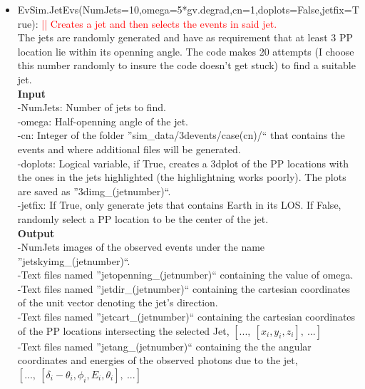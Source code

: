 \documentclass[article, superscriptaddress, ctexart, nofootinbib]{revtex4}
\newcommand{\tcr}{\textcolor{red}}
\begin{document}
\begin{itemize}
 \item{EvSim.JetEvs(NumJets=10,omega=5*gv.degrad,cn=1,doplots=False,jetfix=True):   \tcr{|| Creates a jet and then selects the events in said jet.}} \\
 The jets are randomly generated and have as requirement that at least 3 PP location lie within its openning angle.
 The code makes 20 attempts (I choose this number randomly to insure the code doesn't get stuck) to find a suitable jet.\\
 {\bf{Input}}\\
 -NumJets: Number of jets to find.\\
 -omega: Half-openning angle of the jet.\\
 -cn: Integer of the folder ''sim\_data/3devents/case(cn)/`` that contains the events and where additional files will be generated.\\
 -doplots: Logical variable, if True, creates a 3dplot of the PP locations with the ones in the jets highlighted (the highlightning works poorly).
 The plots are saved as ''3dimg\_(jetnumber)``.\\
 -jetfix: If True, only generate jets that contains Earth in its LOS. If False, randomly select a PP location to be the center of the jet.\\
  {\bf{Output}}\\
 -NumJets images of the observed events under the name ''jetskyimg\_(jetnumber)``.\\
 -Text files named ''jetopenning\_(jetnumber)`` containing the value of omega.\\
 -Text files named ''jetdir\_(jetnumber)`` containing the cartesian coordinates of the unit vector denoting the jet's direction.\\
 -Text files named ''jetcart\_(jetnumber)`` containing the cartesian coordinates of the PP locations intersecting the selected Jet, $[...,~[x_i,y_i,z_i],~...]$\\
 -Text files named ''jetang\_(jetnumber)`` containing the  the angular coordinates and energies of the observed photons due to the jet, 
 $[...,~[\delta_i-\theta_i,\phi_i,E_i,\theta_i],~...]$\\
 

\end{itemize}
\end{document}
